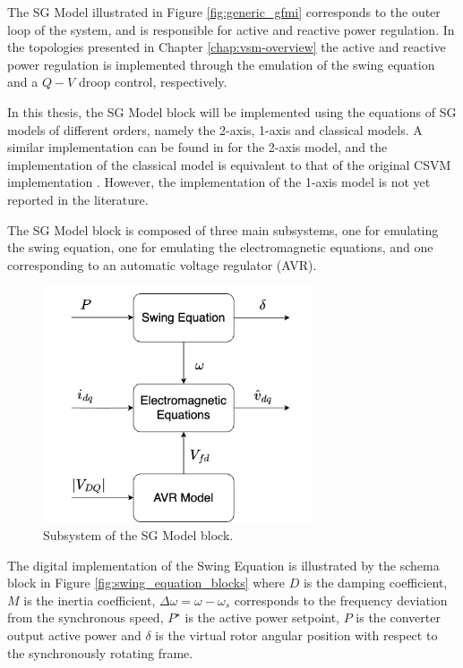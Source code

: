 The SG Model illustrated in Figure \ref{fig:generic_gfmi} corresponds to the
outer loop of the system, and is responsible for active and reactive power
regulation. In the topologies presented in Chapter \ref{chap:vsm-overview} the
active and reactive power regulation is implemented through the emulation of the
swing equation and a $Q-V$ droop control, respectively.

In this thesis, the SG Model block will be implemented using the equations of SG
models of different orders, namely the 2-axis, 1-axis and classical models. A
similar implementation can be found in \cite{zhang2013improved,ma2017vsg} for
the 2-axis model, and the implementation of the classical model is equivalent to
that of the original CSVM implementation \cite{darco2015vsm}. However, the
implementation of the 1-axis model is not yet reported in the literature.

The SG Model block is composed of three main subsystems, one for emulating the
swing equation, one for emulating the electromagnetic equations, and one
corresponding to an automatic voltage regulator (AVR).

\begin{figure}[ht!]
    \centering
    \includegraphics[width=8cm]{images/sm_overall_model.png}
    \caption{Subsystem of the SG Model block.}
    \label{fig:sm_overall_model}
\end{figure}

The digital implementation of the Swing Equation is illustrated by the schema
block in Figure \ref{fig:swing_equation_blocks} where $D$ is the damping
coefficient, $M$ is the inertia coefficient, $\Delta\omega = \omega - \omega_s$
corresponds to the frequency deviation from the synchronous speed, $P^{\star}$
is the active power setpoint, $P$ is the converter output active power and
$\delta$ is the virtual rotor angular position with respect to the synchronously
rotating frame.

